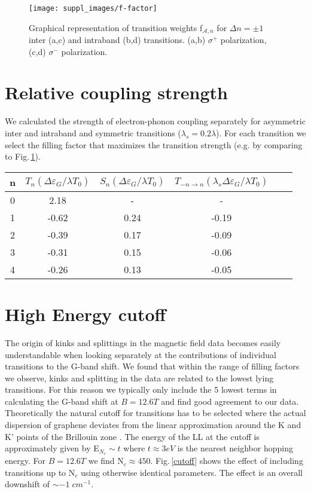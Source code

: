 \documentclass[pra,aps,superscriptaddress,preprint]{revtex4-1}
\begin{document}
\begin{figure}[h!]
   \texttt{[image: suppl\_images/f-factor]}
   \caption{\label{f-factor}Graphical representation of transition weights f$_{\mathcal{A},n}$ for $\Delta n =\pm 1$ inter (a,c) and intraband (b,d) transitions. (a,b) $\sigma^+$ polarization, (c,d) $\sigma^-$ polarization.}
\end{figure}

\newpage
\section{Relative coupling strength}
We calculated the strength of electron-phonon coupling separately for asymmetric inter and intraband and symmetric transitions ($\lambda_s = 0.2\lambda$). For each transition we select the filling factor that maximizes the transition strength (e.g. by comparing to Fig.\,\ref{f-factor}). 

\begin{center}
\begin{tabular}{|c|c|c|c|c|c|}
\hline
n &$T_n \left(\Delta\varepsilon_G / \lambda T_0 \right)$ & $S_n \left(\Delta\varepsilon_G / \lambda T_0 \right)$ & $T_{-n\rightarrow n}\left(\lambda_s \Delta \varepsilon_G / \lambda T_0\right)$ \\\hline
0 & 2.18 & - & - \\\hline
1 &-0.62 & 0.24 &-0.19 \\\hline
2 &-0.39 & 0.17 & -0.09 \\\hline
3 &-0.31 & 0.15 & -0.06 \\\hline
4 &-0.26 & 0.13 & -0.05 \\\hline
\hline
\end{tabular}
\end{center}


\newpage
\section{High Energy cutoff}

The origin of kinks and splittings in the magnetic field data becomes easily understandable when looking separately at the contributions of individual transitions to the G-band shift. We found that within the range of filling factors we observe, kinks and splitting in the data are related to the lowest lying transitions. For this reason we typically only include the 5 lowest terms in calculating the G-band shift at $B=12.6T$ and find good agreement to our data.    
Theoretically the natural cutoff for transitions has to be selected where the actual dispersion of graphene deviates from the linear approximation around the K and K' points of the Brillouin zone \cite{goerbig2011electronic}. The energy of the LL at the cutoff is approximately given by E$_{N_c} \sim t$ where $t\approx 3eV$ is the nearest neighbor hopping energy. For $B=12.6T$ we find N$_c\approx 450$. Fig.\,\ref{cutoff} shows the effect of including transitions up to N$_c$ using otherwise identical parameters. The effect is an overall downshift of $\sim -1\; cm^{-1}$.  
\end{document}

